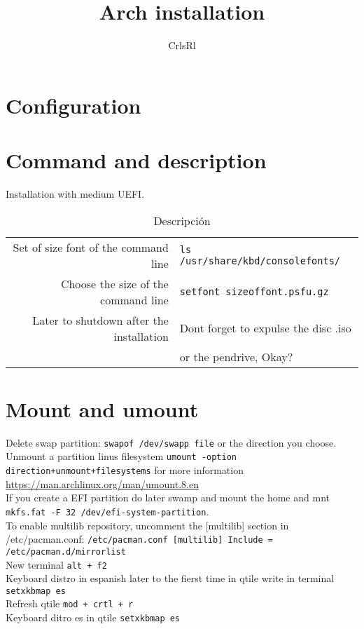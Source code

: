 \documentclass[11pt,letterpaper]{article}
\author{CrlsRl}
\title{Arch installation}
\begin{document}
\maketitle
\section{Configuration}
\section{Command and description}
Installation with medium UEFI.
\begin{table}[h!]
  \centering
  \begin{tabular}{r|l}
    Set of size font of the command line  & \texttt{ls /usr/share/kbd/consolefonts/} \\ Choose the size of the command line & \texttt{setfont sizeoffont.psfu.gz}\\
    Later to shutdown after the installation&Dont forget to expulse the disc .iso \\ & or the pendrive, Okay?
  \end{tabular}
  \caption{Descripción}
\end{table}
\section{Mount and umount}
Delete swap partition: \texttt{swapof /dev/swapp file} or the direction you choose.
\\ 
Unmount a partition linus filesystem \texttt{umount -option direction+unmount+filesystems} for more information \url{https://man.archlinux.org/man/umount.8.en}
\\ 
If you create a EFI partition do later swamp and mount the home and mnt \texttt{ mkfs.fat -F 32 /dev/efi-system-partition}.   
\\ 
To enable multilib repository, uncomment the [multilib] section in /etc/pacman.conf:
\texttt
{/etc/pacman.conf
[multilib]
Include = /etc/pacman.d/mirrorlist
}
\\ New terminal \texttt{alt + f2}
\\ 
Keyboard distro in espanish later to the fierst time in qtile write in terminal \texttt{setxkbmap es}
\\ 
Refresh qtile \texttt{mod + crtl + r}
\\
Keyboard ditro es in qtile \texttt{setxkbmap es}
\end{document}

